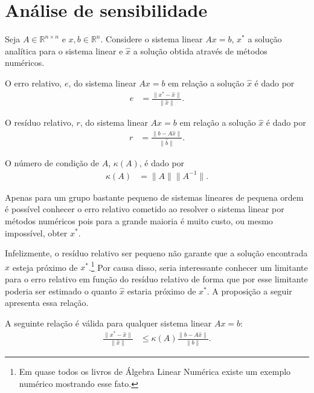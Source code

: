 \documentclass[12pt,a4paper]{article}
\begin{document}
\section{An\'{a}lise de sensibilidade}
Seja $A \in \mathbb{R}^{n \times n}$ e $x, b \in \mathbb{R}^n$. Considere o
sistema linear $A x = b$, $x^*$ a solu\c{c}\~{a}o anal\'{i}tica para o sistema
linear e $\hat{x}$ a solu\c{c}\~{a}o obtida atrav\'{e}s de m\'{e}todos
num\'{e}ricos.
\begin{defi}
    O erro relativo, $e$, do sistema linear $A x = b$ em rela\c{c}\~{a}o a
    solu\c{c}\~{a}o $\hat{x}$ \'{e} dado por
    \begin{align*}
        e &= \frac{\| x^* - \hat{x} \|}{\| \hat{x} \|}.
    \end{align*}
\end{defi}
\begin{defi}
    O res\'{i}duo relativo, $r$, do sistema linear $A x = b$ em rela\c{c}\~{a}o
    a
    solu\c{c}\~{a}o $\hat{x}$ \'{e} dado por
    \begin{align*}
        r &= \frac{\| b - A \hat{x} \|}{\| \hat{b} \|}.
    \end{align*}
\end{defi}
\begin{defi}
    O n\'{u}mero de condi\c{c}\~{a}o de $A$, $\kappa(A)$, \'{e} dado por
    \begin{align*}
        \kappa(A) &= \| A \| \| A^{-1} \|.
    \end{align*}
\end{defi}

Apenas para um grupo bastante pequeno de sistemas lineares de pequena ordem
\'{e} poss\'{i}vel conhecer o erro relativo cometido ao resolver o sistema
linear por m\'{e}todos num\'{e}ricos pois para a grande maioria \'{e} muito
custo, ou mesmo imposs\'{i}vel, obter $x^*$.

Infelizmente, o res\'{i}duo relativo ser pequeno n\~{a}o garante que a
solu\c{c}\~{a}o encontrada $\hat{x}$ esteja pr\'{o}ximo de
$x^*$.\footnote{Em quase todos os livros de \'{A}lgebra Linear Num\'{e}rica
existe um exemplo num\'{e}rico mostrando esse fato.} Por causa disso, seria
interessante conhecer um limitante para o erro relativo em fun\c{c}\~{a}o do
res\'{i}duo relativo de forma que por esse limitante poderia ser estimado o
quanto $\hat{x}$ estaria pr\'{o}ximo de $x^*$. A proposi\c{c}\~{a}o a seguir
apresenta essa rela\c{c}\~{a}o.
\begin{prop}
    A seguinte rela\c{c}\~{a}o \'{e} v\'{a}lida para qualquer sistema linear $A
    x = b$:
    \begin{align*}
        \frac{\| x^* - \hat{x} \|}{\| \hat{x} \|} &\leq \kappa(A)
        \frac{\| b - A \hat{x} \|}{\| b \|}.
    \end{align*}
\end{prop}
\end{document}
